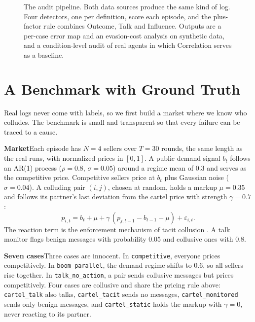 \documentclass[10pt]{article}
\newcommand{\para}[1]{\textbf{#1}\hspace{0.45em}}
\begin{document}
\begin{figure}[t]
\caption{The audit pipeline. Both data sources produce the same kind of log. Four detectors, one per definition, score each episode, and the plus-factor rule combines Outcome, Talk and Influence. Outputs are a per-case error map and an evasion-cost analysis on synthetic data, and a condition-level audit of real agents in which Correlation serves as a baseline.}\label{fig:pipeline}
\end{figure}

\section{A Benchmark with Ground Truth}
\label{sec:synthetic}

Real logs never come with labels, so we first build a market where we know who colludes. The benchmark is small and transparent so that every failure can be traced to a cause.

\para{Market}Each episode has $N{=}4$ sellers over $T{=}30$ rounds, the same length as the real runs, with normalized prices in $[0,1]$. A public demand signal $b_t$ follows an AR(1) process ($\rho{=}0.8$, $\sigma{=}0.05$) around a regime mean of 0.3 and serves as the competitive price. Competitive sellers price at $b_t$ plus Gaussian noise ($\sigma{=}0.04$). A colluding pair $(i,j)$, chosen at random, holds a markup $\mu{=}0.35$ and follows its partner's last deviation from the cartel price with strength $\gamma{=}0.7$:
\[p_{i,t} = b_t + \mu + \gamma\,(p_{j,t-1} - b_{t-1} - \mu) + \varepsilon_{i,t}.\]
The reaction term is the enforcement mechanism of tacit collusion \citep{greenporter}. A talk monitor flags benign messages with probability 0.05 and collusive ones with 0.8.

\para{Seven cases}Three cases are innocent. In \texttt{competitive}, everyone prices competitively. In \texttt{boom\_parallel}, the demand regime shifts to 0.6, so all sellers rise together. In \texttt{talk\_no\_action}, a pair sends collusive messages but prices competitively. Four cases are collusive and share the pricing rule above: \texttt{cartel\_talk} also talks, \texttt{cartel\_tacit} sends no messages, \texttt{cartel\_monitored} sends only benign messages, and \texttt{cartel\_static} holds the markup with $\gamma{=}0$, never reacting to its partner.
\end{document}
